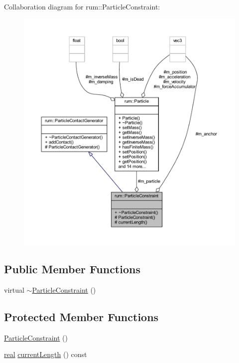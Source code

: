 Collaboration diagram for rum\+:\+:Particle\+Constraint\+:\nopagebreak
\begin{figure}[H]
\begin{center}
\leavevmode
\includegraphics[width=350pt]{classrum_1_1_particle_constraint__coll__graph}
\end{center}
\end{figure}
\subsection*{Public Member Functions}
\begin{DoxyCompactItemize}
\item 
virtual \mbox{\hyperlink{classrum_1_1_particle_constraint_a746b1856af604ddc7e0b763114b11d43}{$\sim$\+Particle\+Constraint}} ()
\end{DoxyCompactItemize}
\subsection*{Protected Member Functions}
\begin{DoxyCompactItemize}
\item 
\mbox{\hyperlink{classrum_1_1_particle_constraint_aee5151f3813c45df9e65bf5ae29ba1d1}{Particle\+Constraint}} ()
\item 
\mbox{\hyperlink{namespacerum_a7e8cca23573d5eaead0f138cbaa4862c}{real}} \mbox{\hyperlink{classrum_1_1_particle_constraint_a5a9d5520ee68acb19f91b792c0858d1d}{current\+Length}} () const
\end{DoxyCompactItemize}
